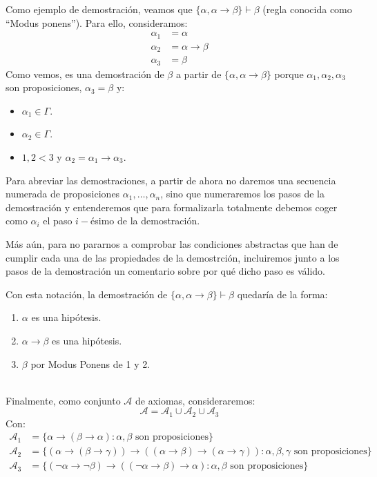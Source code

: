 \begin{ejemplo}
    Como ejemplo de demostración, veamos que $\{\alpha,\alpha\to\beta\}\vdash \beta$ (regla conocida como ``Modus ponens''). Para ello, consideramos:
    \begin{align*}
        \alpha_1 &= \alpha \\
        \alpha_2 &= \alpha\to\beta \\
        \alpha_3 &= \beta
    \end{align*}
    Como vemos, es una demostración de $\beta$ a partir de $\{\alpha,\alpha\to\beta\}$ porque $\alpha_1,\alpha_2,\alpha_3$ son proposiciones, $\alpha_3=\beta$ y:
    \begin{itemize}
        \item $\alpha_1\in \Gamma$.
        \item $\alpha_2\in \Gamma$.
        \item $1,2<3$ y $\alpha_2 = \alpha_1\to \alpha_3$.
    \end{itemize}
\end{ejemplo}

\begin{notacion}
    Para abreviar las demostraciones, a partir de ahora no daremos una secuencia numerada de proposiciones $\alpha_1,\ldots,\alpha_n$, sino que numeraremos los pasos de la demostración y entenderemos que para formalizarla totalmente debemos coger como $\alpha_i$ el paso $i-$ésimo de la demostración.

    Más aún, para no pararnos a comprobar las condiciones abstractas que han de cumplir cada una de las propiedades de la demostrción, incluiremos junto a los pasos de la demostración un comentario sobre por qué dicho paso es válido.

    Con esta notación, la demostración de $\{\alpha,\alpha\to\beta\}\vdash \beta$ quedaría de la forma:
    \begin{enumerate}
        \item $\alpha$ es una hipótesis.
        \item $\alpha\to\beta$ es una hipótesis.
        \item $\beta$ por Modus Ponens de 1 y 2.
    \end{enumerate}
\end{notacion}~\\

\noindent
Finalmente, como conjunto $\mathcal{A}$ de axiomas, consideraremos:
\begin{equation*}
    \mathcal{A} = \mathcal{A}_1 \cup \mathcal{A}_2 \cup \mathcal{A}_3
\end{equation*}
Con:
\begin{align*}
    \mathcal{A}_1 &= \{\alpha\to(\beta\to\alpha) : \alpha,\beta \text{\ son proposiciones}\} \\
    \mathcal{A}_2 &= \{(\alpha\to(\beta\to\gamma))\to((\alpha\to\beta)\to(\alpha\to\gamma)) : \alpha,\beta,\gamma \text{\ son proposiciones}\} \\
    \mathcal{A}_3 &= \{(\lnot\alpha\to\lnot\beta)\to((\lnot\alpha\to\beta)\to\alpha) : \alpha,\beta \text{\ son proposiciones}\}
\end{align*}

